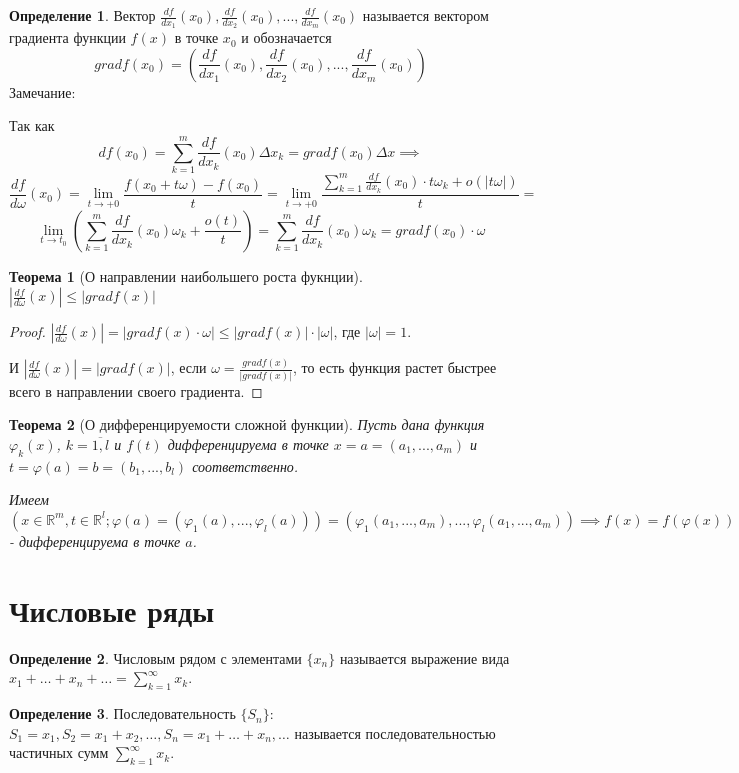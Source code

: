 \documentclass[a4paper,oneside]{article}
\newcommand{\R}{\mathbb{R}}
\newcommand{\seriesx}{\displaystyle\sum_{k=1}^\infty x_k}
\newtheorem{theorem}{Теорема}[subsection]
\theoremstyle{definition}
\newtheorem{definition}{Определение}[subsection]
\theoremstyle{definition}
\theoremstyle{definition}
\begin{document}
\begin{definition}
    Вектор $\frac{df}{dx_1}(x_0), \frac{df}{dx_2}(x_0), ..., \frac{df}{dx_m}(x_0)$ называется вектором градиента функции $f(x)$ в точке $x_0$ и обозначается
    $$grad f(x_0) = (\frac{df}{dx_1}(x_0), \frac{df}{dx_2}(x_0), ..., \frac{df}{dx_m}(x_0))$$
    Замечание:

    Так как $$df(x_0) = \sum_{k=1}^m\frac{df}{dx_k}(x_0)\Delta x_k = grad f(x_0) \Delta x \implies$$
    $$\frac{df}{d\omega}(x_0) = \lim_{t \to +0}\frac{f(x_0+t\omega)-f(x_0)}{t} = \lim_{t \to +0}\frac{\sum_{k=1}^m\frac{df}{dx_k}(x_0)\cdot t\omega_k + o(|t\omega|)}{t} =$$
    $$\lim_{t \to t_0}(\sum_{k=1}^m\frac{df}{dx_k}(x_0)\omega_k+\frac{o(t)}{t}) = \sum_{k=1}^m\frac{df}{dx_k}(x_0)\omega_k = grad f(x_0)\cdot\omega$$
\end{definition}

\begin{theorem}[О направлении наибольшего роста фукнции]
    $|\frac{df}{d\omega}(x)| \leq |grad f(x)|$
\end{theorem}
\begin{proof}
    $|\frac{df}{d\omega}(x)| = |grad f(x)\cdot\omega| \leq |grad f(x)|\cdot|\omega|$, где $|\omega| = 1$.

    И $|\frac{df}{d\omega}(x)| = |grad f(x)|$, если $\omega = \frac{gradf(x)}{|gradf(x)|}$, то есть функция растет быстрее всего в направлении своего градиента.
\end{proof}

\begin{theorem}[О дифференцируемости сложной функции]
    Пусть дана функция $\varphi_k(x)$, $k = \overline{1,l}$ и $f(t)$ дифференцируема в точке $x = a = (a_1,...,a_m)$ и $t = \varphi(a) = b = (b_1,...,b_l)$ соответственно.
    
    Имеем $(x\in\R^m, t\in\R^l; \varphi(a) = (\varphi_1(a),...,\varphi_l(a))) = (\varphi_1(a_1,...,a_m),...,\varphi_l(a_1,...,a_m)) \implies f(x)=f(\varphi(x))$ - дифференцируема в точке $a$.
\end{theorem}

\section{Числовые ряды}
\begin{definition}
    Числовым рядом с элементами $\{x_n\}$ называется выражение вида $x_1 + \dots + x_n + \dots = \seriesx$.
\end{definition}

\begin{definition}
    Последовательность $\{S_n\}$: $S_1 = x_1, S_2 = x_1 + x_2, \dots, S_n = x_1 + \dots + x_n, \dots$ называется последовательностью частичных сумм $\seriesx$.
\end{definition}
\end{document}
